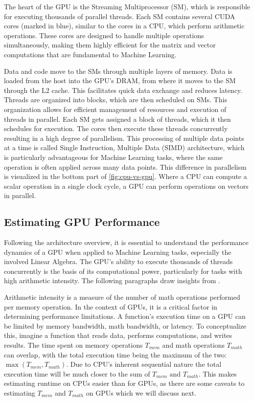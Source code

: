 The heart of the GPU is the Streaming Multiprocessor (SM), which is responsible for executing thousands of parallel threads. Each SM contains several CUDA cores (marked in blue), similar to the cores in a CPU, which perform arithmetic operations. These cores are designed to handle multiple operations simultaneously, making them highly efficient for the matrix and vector computations that are fundamental to Machine Learning.

Data and code move to the SMs through multiple layers of memory. Data is loaded from the host into the GPU's DRAM, from where it moves to the SM through the L2 cache. This facilitates quick data exchange and reduces latency. Threads are organized into blocks, which are then scheduled on SMs. This organization allows for efficient management of resources and execution of threads in parallel. Each SM gets assigned a block of threads, which it then schedules for execution. The cores then execute these threads concurrently resulting in a high degree of parallelism. This processing of multiple data points at a time is called Single Instruction, Multiple Data (SIMD) architecture, which is particularly advantageous for Machine Learning tasks, where the same operation is often applied across many data points. This difference in parallelism is visualized in the bottom part of \autoref{fig:cpu-vs-gpu}. Where a CPU can compute a scalar operation in a single clock cycle, a GPU can perform operations on vectors in parallel.

\subsection{Estimating GPU Performance}
\label{subsec:gpu-performance}
Following the architecture overview, it is essential to understand the performance dynamics of a GPU when applied to Machine Learning tasks, especially the involved Linear Algebra. The GPU's ability to execute thousands of threads concurrently is the basis of its computational power, particularly for tasks with high arithmetic intensity. The following paragraphs draw insights from \cite{nvidia-gpu-performance:online}.

Arithmetic intensity is a measure of the number of math operations performed per memory operation. In the context of GPUs, it is a critical factor in determining performance limitations. A function's execution time on a GPU can be limited by memory bandwidth, math bandwidth, or latency. To conceptualize this, imagine a function that reads data, performs computations, and writes results. The time spent on memory operations $ T_{mem} $ and math operations $ T_{math} $ can overlap, with the total execution time being the maximum of the two: $ \max(T_{mem}, T_{math})$. Due to CPU's inherent sequential nature the total execution time will be much closer to the sum of $T_{mem} \text{ and } T_{math}$. This makes estimating runtime on CPUs easier than for GPUs, as there are some caveats to estimating $T_{mem}$ and $T_{math}$ on GPUs which we will discuss next.

